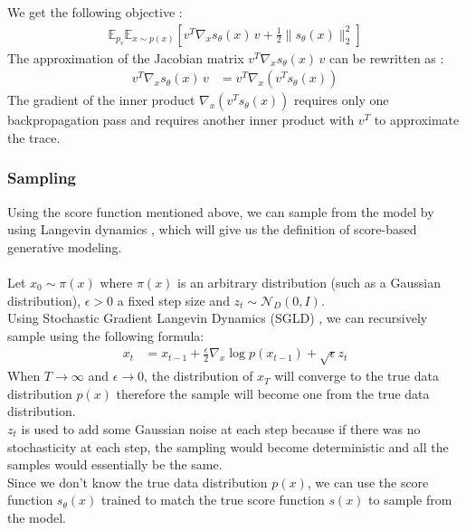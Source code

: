 \documentclass{article}
\begin{document}
We get the following objective \cite{song2019sliced}:
\begin{align}
  \mathbb{E}_{p_v} \mathbb{E}_{x \sim p(x)} \left[ v^T \nabla_x s_\theta (x) \, v + \frac{1}{2} \| s_\theta (x) \|_2^2 \right]
\end{align}
The approximation of the Jacobian matrix $v^T \nabla_x s_\theta (x) \, v$ can be rewritten as \cite{song2019sliced}:
\begin{align}
  v^T \nabla_x s_\theta (x) \, v &= v^T \nabla_x (v^T s_\theta (x))
\end{align}
The gradient of the inner product $\nabla_x (v^T s_\theta (x))$ requires only one backpropagation pass and requires another inner product with $v^T$ to approximate the trace. \cite{song2019sliced} 

\subsubsection{Sampling}
Using the score function mentioned above, we can sample from the model by using Langevin dynamics \cite{song2020generative, WelTeh2011a}, which will give us the definition of score-based generative modeling. \cite{song2020generative}
\\\\
Let $x_0 \sim \pi (x)$ where $\pi (x)$ is an arbitrary distribution (such as a Gaussian distribution), $\epsilon > 0$ a fixed step size and $z_t \sim \mathcal{N}_D (0, I)$. \\
Using Stochastic Gradient Langevin Dynamics (SGLD) \cite{song2020generative, WelTeh2011a}, we can recursively sample using the following formula:
\begin{align}
  x_t &= x_{t-1} + \frac{\epsilon}{2} \nabla_x \log p(x_{t-1}) + \sqrt{\epsilon} z_t
\end{align}
When $T \rightarrow \infty$ and $\epsilon \rightarrow 0$, the distribution of $x_T$ will converge to the true data distribution $p(x)$ therefore the sample will become one from the true data distribution. \cite{song2020generative,WelTeh2011a} \\
$z_t$ is used to add some Gaussian noise at each step because if there was no stochasticity at each step, the sampling would become deterministic and all the samples would essentially be the same.\\
Since we don't know the true data distribution $p(x)$, we can use the score function $s_\theta (x)$ trained to match the true score function $s(x)$ to sample from the model. \\
\end{document}

